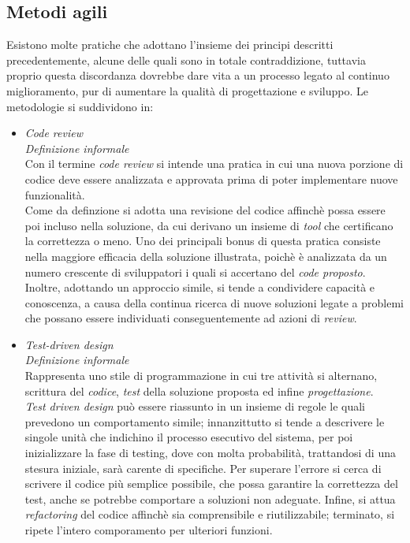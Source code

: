 \documentclass{article}
\begin{document}
\subsection*{Metodi agili}
\large
Esistono molte pratiche che adottano l'insieme dei principi descritti precedentemente, alcune delle quali sono in totale contraddizione, tuttavia proprio questa discordanza dovrebbe dare vita a un processo legato al continuo miglioramento, pur di aumentare la qualità di progettazione e sviluppo. Le metodologie si suddividono in:
\begin{itemize}[label={-}]
    \itemsep0em
    \item \textit{Code review}\vspace*{7pt}\\\textit{Definizione informale}\\Con il termine \textit{code review} si intende una pratica in cui una nuova porzione di codice deve essere analizzata e approvata prima di poter implementare nuove funzionalità.\vspace*{14pt}\\Come da definzione si adotta una revisione del codice affinchè possa essere poi incluso nella soluzione, da cui derivano un insieme di \textit{tool} che certificano la correttezza o meno. Uno dei principali bonus di questa pratica consiste nella maggiore efficacia della soluzione illustrata, poichè è analizzata da un numero crescente di sviluppatori i quali si accertano del \textit{code proposto}. Inoltre, adottando un approccio simile, si tende a condividere capacità e conoscenza, a causa della continua ricerca di nuove soluzioni legate a problemi che possano essere individuati conseguentemente ad azioni di \textit{review}. 
    \item \textit{Test-driven design}\vspace*{7pt}\\\textit{Definizione informale}\\Rappresenta uno stile di programmazione in cui tre attività si alternano, scrittura del \textit{codice}, \textit{test} della soluzione proposta ed infine \textit{progettazione}.\vspace*{14pt}\\\textit{Test driven design} può essere riassunto in un insieme di regole le quali prevedono un comportamento simile; innanzittutto si tende a descrivere le singole unità che indichino il processo esecutivo del sistema, per poi inizializzare la fase di testing, dove con molta probabilità, trattandosi di una stesura iniziale, sarà carente di specifiche. Per superare l'errore si cerca di scrivere il codice più semplice possibile, che possa garantire la correttezza del test, anche se potrebbe comportare a soluzioni non adeguate. Infine, si attua \textit{refactoring} del codice affinchè sia comprensibile e riutilizzabile; terminato, si ripete l'intero comporamento per ulteriori funzioni.

\end{itemize}
\end{document}
